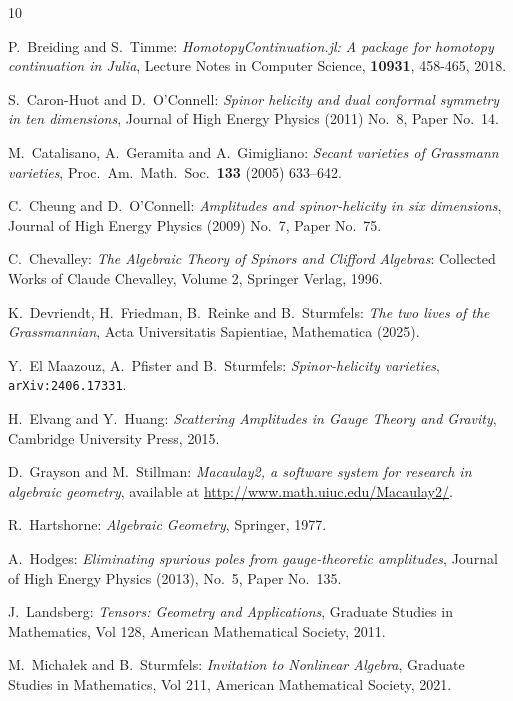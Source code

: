 \documentclass[english]{ourlematema}
\numberwithin{theorem}{section}
\theoremstyle{definition}
\begin{document}
\begin{small}
\begin{thebibliography}{10}
\setlength{\itemsep}{-0.12mm}

 P.~Breiding and S.~Timme: {\em HomotopyContinuation.jl: 
A package for homotopy continuation in Julia},
Lecture Notes in Computer Science, {\bf 10931}, 458-465, 2018.

 S.~Caron-Huot and  D.~O'Connell: 
{\em Spinor helicity and dual conformal symmetry in ten dimensions},
Journal of High Energy Physics (2011) No.~8, Paper No.~14.

M.~Catalisano, A.~Geramita and A.~Gimigliano:
{\em Secant varieties of Grassmann varieties},
Proc.~Am.~Math.~Soc.~{\bf 133} (2005) 633--642.

 C.~Cheung and D.~O'Connell:
{\em Amplitudes and spinor-helicity in six dimensions},
Journal of High Energy Physics (2009)
No.~7, Paper No.~75.

 C.~Chevalley: {\em The Algebraic Theory of Spinors and
Clifford Algebras}: Collected Works of Claude Chevalley, Volume 2, Springer Verlag, 1996.

 K.~Devriendt, H.~Friedman, B.~Reinke and B.~Sturmfels:
{\em The two lives of the Grassmannian},
Acta Universitatis Sapientiae, Mathematica (2025).

 Y.~El Maazouz, A.~Pfister and B.~Sturmfels:
{\em Spinor-helicity varieties},  {\tt arXiv:2406.17331}.

 H.~Elvang and Y.~Huang: {\em Scattering Amplitudes                 
in Gauge Theory and Gravity}, Cambridge University Press, 2015.

 D.~Grayson and M.~Stillman:
{\em Macaulay2, a software system for research in algebraic geometry},
          available at \url{http://www.math.uiuc.edu/Macaulay2/}.

R.~Hartshorne: {\em Algebraic Geometry}, Springer, 1977.

A.~Hodges: {\em
Eliminating spurious poles from gauge-theoretic amplitudes},
Journal of High Energy Physics  (2013), No.~5, Paper No.~135.

J.~Landsberg: {\em Tensors: Geometry and Applications}, Graduate Studies in Mathematics, Vol 128, American Mathematical Society, 2011.

 M.~Micha\l ek and B.~Sturmfels:  {\em Invitation to Nonlinear Algebra},
 Graduate Studies in Mathematics, Vol 211, American Mathematical Society, 2021.


\end{thebibliography}
\end{small}
\end{document}
